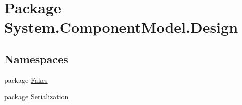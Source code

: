 \hypertarget{namespace_system_1_1_component_model_1_1_design}{\section{Package System.\-Component\-Model.\-Design}
\label{namespace_system_1_1_component_model_1_1_design}
}
\subsection*{Namespaces}
\begin{DoxyCompactItemize}
\item 
package \hyperlink{namespace_system_1_1_component_model_1_1_design_1_1_fakes}{Fakes}
\item 
package \hyperlink{namespace_system_1_1_component_model_1_1_design_1_1_serialization}{Serialization}
\end{DoxyCompactItemize}
